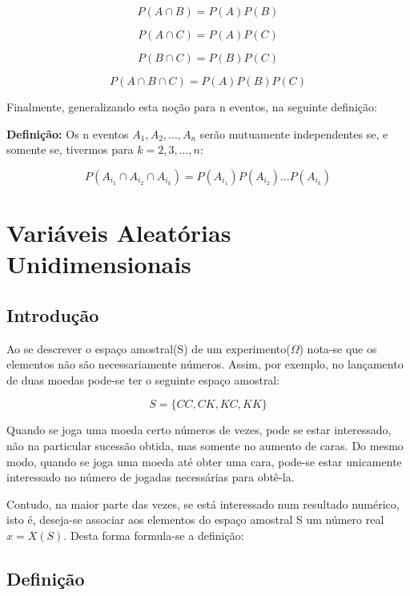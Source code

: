 \documentclass[a4paper,12pt]{report}
\begin{document}
{$$
P(A \cap B)=P(A)P(B)
$$

$$
P(A \cap C)=P(A)P(C)
$$

$$
P(B \cap C)=P(B)P(C)
$$

$$
P(A \cap B \cap C)=P(A)P(B)P(C)
$$


Finalmente, generalizando esta noção para n eventos, na seguinte
definição:\vskip0.3cm



\textbf{Definição:} Os n eventos $A_{1},A_{2},...,A_{n}$ serão
mutuamente independentes se, e somente se, tivermos para
$k=2,3,...,n$:

\begin{equation}\label{}
    P(A_{i_{1}} \cap A_{i_{2}} \cap A_{i_{k}})=
    P(A_{i_{1}})P(A_{i_{2}})...P(A_{i_{k}})
\end{equation}





\chapter{Variáveis Aleatórias Unidimensionais}
\section{Introdução}

Ao se descrever o espaço amostral(S) de um experimento($\Omega$)
nota-se que os elementos não são necessariamente números. Assim,
por exemplo, no lançamento de duas moedas pode-se ter o seguinte
espaço amostral:\vskip0.3cm


$$
S = \{CC, CK, KC, KK\}
$$


\par Quando se joga uma moeda certo números de vezes, pode se estar
interessado, não na particular sucessão obtida, mas somente no
aumento de caras. Do mesmo modo, quando se joga uma moeda até
obter uma cara, pode-se estar unicamente interessado no número de
jogadas necessárias para obtê-la.\vskip0.3cm

\par Contudo, na maior parte das vezes, se está interessado num
resultado numérico, isto é, deseja-se associar aos elementos do
espaço amostral S um número real $x=X(S)$. Desta forma formula-se
a definição:\vskip0.3cm

\section{Definição}

}
\end{document}
